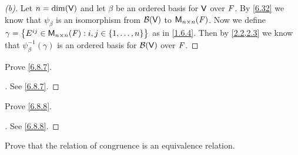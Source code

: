 \begin{proof}[(b)]
  Let \(n = \dim(\mathsf{V})\) and let \(\beta\) be an ordered basis for \(\mathsf{V}\) over \(\mathit{F}\).
  By \cref{6.32} we know that \(\psi_{\beta}\) is an isomorphism from \(\mathcal{B}(\mathsf{V})\) to \(\ms[n][n][\F]\).
  Now we define \(\gamma = \set{E^{i j} \in \ms[n][n][\F] : i, j \in \set{1, \dots, n}}\) as in \cref{1.6.4}.
  Then by \cref{2.2,2.3} we know that \(\psi_{\beta}^{-1}(\gamma)\) is an ordered basis for \(\mathcal{B}(\mathsf{V})\) over \(\mathit{F}\).
\end{proof}

\begin{ex}\label{ex:6.8.10}
  Prove \cref{6.8.7}.
\end{ex}

\begin{proof}[]
  See \cref{6.8.7}.
\end{proof}

\begin{ex}\label{ex:6.8.11}
  Prove \cref{6.8.8}.
\end{ex}

\begin{proof}[]
  See \cref{6.8.8}.
\end{proof}

\begin{ex}\label{ex:6.8.12}
  Prove that the relation of congruence is an equivalence relation.
\end{ex}

